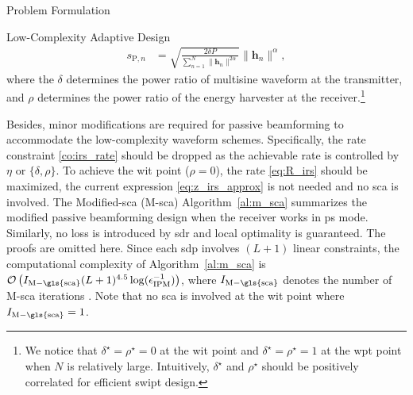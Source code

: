 \begin{section}{Problem Formulation}
\begin{subsection}{Low-Complexity Adaptive Design}
\begin{align}
			s_{\mathrm{P}, n} &= \sqrt{\frac{2 \delta P}{\sum_{n=1}^N \lVert{\mathbf{h}_n \rVert^{2 \alpha}}}}\lVert{\mathbf{h}_n}\rVert^\alpha, \label{eq:s_p}
		\end{align}
		where the $\delta$ determines the power ratio of multisine waveform at the transmitter, and $\rho$ determines the power ratio of the energy harvester at the receiver.\footnote{We notice that $\delta^{\star}=\rho^{\star}=0$ at the \gls{wit} point and $\delta^{\star}=\rho^{\star}=1$ at the \gls{wpt} point when $N$ is relatively large. Intuitively, $\delta^{\star}$ and $\rho^{\star}$ should be positively correlated for efficient \gls{swipt} design.}

		Besides, minor modifications are required for passive beamforming to accommodate the low-complexity waveform schemes. Specifically, the rate constraint \eqref{co:irs_rate} should be dropped as the achievable rate is controlled by $\eta$ or $\{\delta,\rho\}$. To achieve the \gls{wit} point ($\rho=0$), the rate \eqref{eq:R_irs} should be maximized, the current expression \eqref{eq:z_irs_approx} is not needed and no \gls{sca} is involved. The Modified-\gls{sca} (M-\gls{sca}) Algorithm~\ref{al:m_sca} summarizes the modified passive beamforming design when the receiver works in \gls{ps} mode. Similarly, no loss is introduced by \gls{sdr} and local optimality is guaranteed. The proofs are omitted here. Since each \gls{sdp} involves $(L+1)$ linear constraints, the computational complexity of Algorithm~\ref{al:m_sca} is $\mathcal{O}\left(I_{\mathrm{M-\gls{sca}}}(L+1)^{4.5} \log(\epsilon_{\mathrm{IPM}}^{-1})\right)$, where $I_{\mathrm{M-\gls{sca}}}$ denotes the number of M-\gls{sca} iterations \cite{Luo2010b}. Note that no \gls{sca} is involved at the \gls{wit} point where $I_{\mathrm{M-\gls{sca}}}=1$.


\end{subsection}
\end{section}
